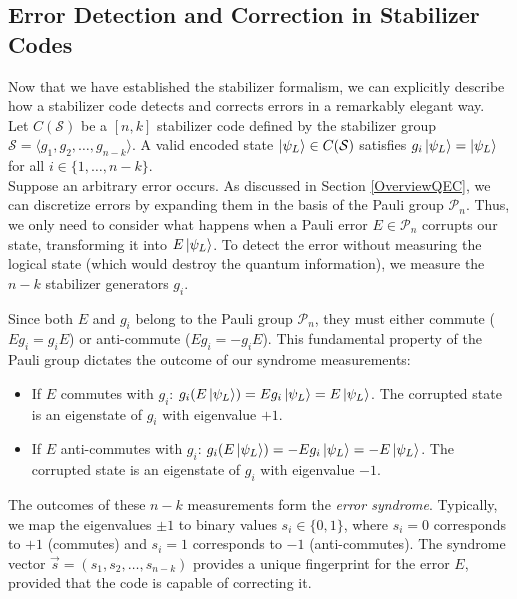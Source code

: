 \documentclass[12pt, twoside, openany]{book}
\begin{document}
\subsection{Error Detection and Correction in Stabilizer Codes}

Now that we have established the stabilizer formalism, we can explicitly describe how a stabilizer code detects and corrects errors in a remarkably elegant way. \cite{Gottesman1997}\\

Let $C(\mathcal{S})$ be a $[n, k]$ stabilizer code defined by the stabilizer group $\mathcal{S} = \langle g_1, g_2, \ldots, g_{n-k} \rangle$. A valid encoded state $\ket{\psi_L} \in C(\mathcal{S})$ satisfies $g_i \ket{\psi_L} = \ket{\psi_L}$ for all $i \in \{1, \dots, n-k\}$. \\

Suppose an arbitrary error occurs. As discussed in Section \ref{OverviewQEC}, we can discretize errors by expanding them in the basis of the Pauli group $\mathcal{P}_n$. Thus, we only need to consider what happens when a Pauli error $E \in \mathcal{P}_n$ corrupts our state, transforming it into $E \ket{\psi_L}$. To detect the error without measuring the logical state (which would destroy the quantum information), we measure the $n-k$ stabilizer generators $g_i$. 

Since both $E$ and $g_i$ belong to the Pauli group $\mathcal{P}_n$, they must either commute ($E g_i = g_i E$) or anti-commute ($E g_i = -g_i E$). This fundamental property of the Pauli group dictates the outcome of our syndrome measurements: 

\begin{itemize}
    \item If $E$ commutes with $g_i$: $g_i (E \ket{\psi_L}) = E g_i \ket{\psi_L} = E \ket{\psi_L}$. The corrupted state is an eigenstate of $g_i$ with eigenvalue $+1$.
    \item If $E$ anti-commutes with $g_i$: $g_i (E \ket{\psi_L}) = -E g_i \ket{\psi_L} = -E \ket{\psi_L}$. The corrupted state is an eigenstate of $g_i$ with eigenvalue $-1$.
\end{itemize}

The outcomes of these $n-k$ measurements form the \textit{error syndrome}. Typically, we map the eigenvalues $\pm 1$ to binary values $s_i \in \{0, 1\}$, where $s_i = 0$ corresponds to $+1$ (commutes) and $s_i = 1$ corresponds to $-1$ (anti-commutes). The syndrome vector $\vec{s} = (s_1, s_2, \ldots, s_{n-k})$ provides a unique fingerprint for the error $E$, provided that the code is capable of correcting it. 
\end{document}

